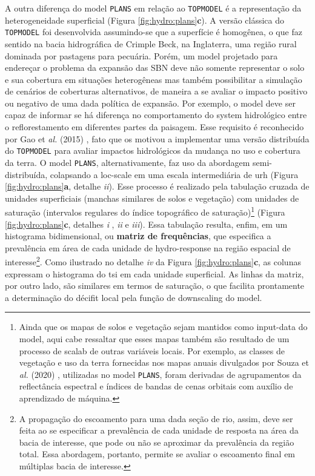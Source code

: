 \documentclass[./main.tex]{subfiles}
\begin{document}
\par A outra diferença do \gls{model} \texttt{PLANS} em relação ao \texttt{TOPMODEL} é a representação da heterogeneidade superficial (Figura \ref{fig:hydro:plans}\textbf{c}). A versão clássica do \texttt{TOPMODEL} foi desenvolvida assumindo-se que a superfície é homogênea, o que faz sentido na bacia hidrográfica de Crimple Beck, na Inglaterra, uma região rural dominada por pastagens para pecuária. Porém, um \gls{model} projetado para endereçar o problema da expansão das SBN deve não somente representar o solo e sua cobertura em situações heterogêneas mas também possibilitar a simulação de cenários de coberturas alternativos, de maneira a se avaliar o impacto positivo ou negativo de uma dada política de expansão. Por exemplo, o \gls{model} deve ser capaz de informar se há diferença no comportamento do \gls{system} hidrológico entre o reflorestamento em diferentes partes da paisagem. Esse requisito é reconhecido por Gao et \textit{al.} (2015) \cite{Gao2015a}, fato que os motivou a implementar uma versão distribuída do \texttt{TOPMODEL} para avaliar impactos hidrológicos da mudança no uso e cobertura da terra. O \gls{model} \texttt{PLANS}, alternativamente, faz uso da abordagem semi-distribuída, colapsando a \gls{loc-scale} em uma escala intermediária de \gls{urh} (Figura \ref{fig:hydro:plans}\textbf{a}, detalhe \textit{ii}). Esse processo é realizado pela tabulação cruzada de unidades superficiais (manchas similares de solos e vegetação) com unidades de saturação (intervalos regulares do índice topográfico de saturação)\footnote{Ainda que os mapas de solos e vegetação sejam mantidos como \gls{input-data} do \gls{model}, aqui cabe ressaltar que esses mapas também são resultado de um processo de \gls{scalab} de outras variáveis locais. Por exemplo, as classes de vegetação e uso da terra fornecidas nos mapas anuais divulgados por Souza et \textit{al.} (2020) \cite{Souza2020a}, utilizadas no \gls{model} \texttt{PLANS}, foram derivadas de agrupamentos da reflectância espectral e índices de bandas de cenas orbitais com auxílio de aprendizado de máquina.} (Figura \ref{fig:hydro:plans}\textbf{c}, detalhes \textit{i} , \textit{ii} e \textit{iii}). Essa tabulação resulta, enfim, em um histograma bidimensional, ou \textbf{matriz de frequências}, que especifica a prevalência em área de cada unidade de \gls{hydro-response} na região espacial de interesse\footnote{A propagação do escoamento para uma dada seção de rio, assim, deve ser feita ao se especificar a prevalência de cada unidade de resposta na área da bacia de interesse, que pode ou não se aproximar da prevalência da região total. Essa abordagem, portanto, permite se avaliar o escoamento final em múltiplas bacia de interesse.}. Como ilustrado no detalhe \textit{iv} da Figura \ref{fig:hydro:plans}\textbf{c}, as colunas expressam o histograma do \gls{tsi} em cada unidade superficial. As linhas da matriz, por outro lado, são similares em termos de saturação, o que facilita prontamente a determinação do décifit local pela função de \gls{downscaling} do \gls{model}. 
\end{document}
